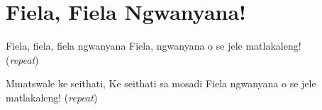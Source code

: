 \starttocol
\chapter{Fiela, Fiela Ngwanyana!}
\nexttocol
\hfill{\it }
\stoptocol
\starttocol
\startlines
{\sc Fiela}, fiela, fiela ngwanyana
Fiela, ngwanyana o se jele matlakaleng!
          \hfill({\it repeat})~~~~~~~~~

Mmatswale ke seithati,
Ke seithati sa mosadi
Fiela ngwanyana o se jele matlakaleng!
          \hfill({\it repeat})~~~~~~~~~
\stoplines
\nexttocol

\stoptocol
